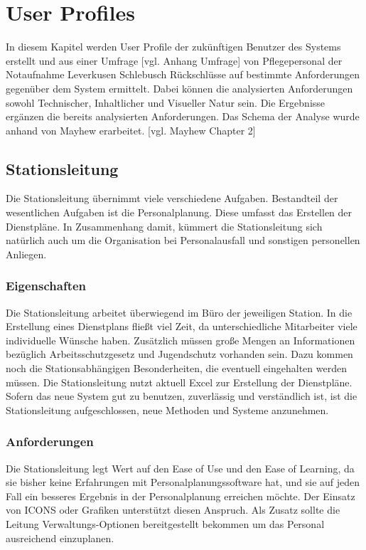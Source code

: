 \documentclass[11pt,
paper=a4,
bibtotocnumbered,	  %
liststotocnumbered,  %
DIV=calc,		  %
tablecaptionabove,	  %
headinclude,
]{article}
\begin{document}
\section{User Profiles}
In diesem Kapitel werden User Profile der zukünftigen Benutzer des Systems erstellt und aus einer Umfrage [vgl. Anhang Umfrage] von Pflegepersonal der Notaufnahme Leverkusen Schlebusch Rückschlüsse auf bestimmte Anforderungen gegenüber dem System ermittelt. Dabei können die analysierten Anforderungen sowohl Technischer, Inhaltlicher und Visueller Natur sein. Die Ergebnisse ergänzen die bereits analysierten Anforderungen. Das Schema der Analyse wurde anhand von Mayhew erarbeitet. [vgl. Mayhew Chapter 2]

\subsection{Stationsleitung}
Die Stationsleitung übernimmt viele verschiedene Aufgaben. Bestandteil der wesentlichen Aufgaben ist die Personalplanung. Diese umfasst das Erstellen der Dienstpläne. In Zusammenhang damit, kümmert die Stationsleitung sich natürlich auch um die Organisation bei Personalausfall und sonstigen personellen Anliegen. 

\subsubsection{Eigenschaften}
Die Stationsleitung arbeitet überwiegend im Büro der jeweiligen Station. In die Erstellung eines Dienstplans fließt viel Zeit, da unterschiedliche Mitarbeiter viele individuelle Wünsche haben. Zusätzlich müssen große Mengen an Informationen bezüglich Arbeitsschutzgesetz und Jugendschutz vorhanden sein. Dazu kommen noch die Stationsabhängigen Besonderheiten, die eventuell eingehalten werden müssen. Die Stationsleitung nutzt aktuell Excel zur Erstellung der Dienstpläne. Sofern das neue System gut zu benutzen, zuverlässig und verständlich ist, ist die Stationsleitung aufgeschlossen, neue Methoden und Systeme anzunehmen.  

\subsubsection{Anforderungen}
Die Stationsleitung legt Wert auf den Ease of Use und den Ease of Learning, da sie bisher keine Erfahrungen mit Personalplanungssoftware hat, und sie auf jeden Fall ein besseres Ergebnis in der Personalplanung erreichen möchte. Der Einsatz von ICONS oder Grafiken unterstützt diesen Anspruch. Als Zusatz sollte die Leitung Verwaltungs-Optionen bereitgestellt bekommen um das Personal ausreichend einzuplanen.
\end{document}
